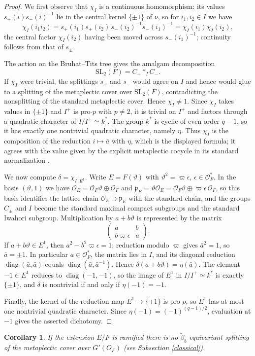 \documentclass[11pt,a4paper,twoside]{amsart}
\newtheorem{corollary}[theorem]{Corollary}
\theoremstyle{definition}
\theoremstyle{remark}
\begin{document}
\begin{proof}

We first observe that $\chi_I$ is a continuous homomorphism: its values
$s_+(i)s_-(i)^{-1}$ lie in the central kernel $\{\pm1\}$ of $\nu$, so
for $i_1,i_2\in I$ we have
\[
\chi_I(i_1 i_2)=s_+(i_1)s_+(i_2)\,s_-(i_2)^{-1}s_-(i_1)^{-1}
=\chi_I(i_1)\chi_I(i_2),
\]
the central factor $\chi_I(i_2)$ having been moved across
$s_-(i_1)^{-1}$; continuity follows from that of $s_\pm$.

The action on the Bruhat--Tits tree gives the amalgam decomposition
\[
\mathrm{SL}_2(F)=C_+\ast_{I}C_-.
\]
If $\chi_I$ were trivial, the splittings $s_+$ and $s_-$ would agree on
$I$ and hence would glue to a splitting of the metaplectic cover over
$\mathrm{SL}_2(F)$, contradicting the nonsplitting of the standard
metaplectic cover. Hence $\chi_I\neq 1$. Since $\chi_I$ takes values in
$\{\pm1\}$ and $I^+$ is pro-$p$ with $p\neq 2$, it is trivial on $I^+$
and factors through a quadratic character of $I/I^+\simeq k^*$. The
group $k^*$ is cyclic of even order $q-1$, so it has exactly one
nontrivial quadratic character, namely $\eta$. Thus $\chi_I$ is the
composition of the reduction $i\mapsto\bar a$ with $\eta$, which is the
displayed formula; it agrees with the value given by the explicit
metaplectic cocycle in its standard normalization \cite{Moore,
RangaRao}.

We now compute $\delta=\chi_I|_{E^1}$. Write $E=F(\vartheta)$ with
$\vartheta^2=\varpi\epsilon$, $\epsilon\in\mathcal{O}_F^*$. In the
basis $(\vartheta,1)$ we have
$\mathcal{O}_E=\mathcal{O}_F\vartheta\oplus\mathcal{O}_F$ and
$\mathfrak{p}_E=\vartheta\mathcal{O}_E=
\mathcal{O}_F\vartheta\oplus\varpi\epsilon\,\mathcal{O}_F$, so this
basis identifies the lattice chain
$\mathcal{O}_E\supset\mathfrak{p}_E$ with the standard chain, and the
groups $C_\pm$ and $I$ become the standard maximal compact subgroups
and the standard Iwahori subgroup. Multiplication by $a+b\vartheta$ is
represented by the matrix
\[
\begin{pmatrix} a & b\\ b\varpi\epsilon & a\end{pmatrix}.
\]
If $a+b\vartheta\in E^1$, then $a^2-b^2\varpi\epsilon=1$; reduction
modulo $\varpi$ gives $\bar a^2=1$, so $\bar a=\pm 1$. In particular
$a\in\mathcal{O}_F^*$, the matrix lies in $I$, and its diagonal
reduction $\operatorname{diag}(\bar a,\bar a)$ equals
$\operatorname{diag}(\bar a,\bar a^{-1})$. Hence
$\delta(a+b\vartheta)=\eta(\bar a)$. The element $-1\in E^1$ reduces to
$\operatorname{diag}(-1,-1)$, so the image of $E^1$ in
$I/I^+\simeq k^*$ is exactly $\{\pm1\}$, and $\delta$ is nontrivial if
and only if $\eta(-1)=-1$.

Finally, the kernel of the reduction map $E^1\to\{\pm1\}$ is pro-$p$,
so $E^1$ has at most one nontrivial quadratic character. Since
$\eta(-1)=(-1)^{(q-1)/2}$, evaluation at $-1$ gives the asserted
dichotomy.
\end{proof}
\begin{corollary}\label{no}If the extension $E/F$ is ramified there is no $\widetilde\beta_b$-equivariant splitting of the metaplectic cover over $G'(O_F)$ (see Subsection \ref{classical}).
\end{corollary}
\end{document}
